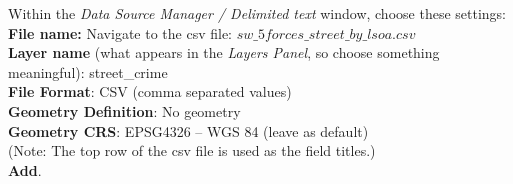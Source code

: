 %	
%	
	
	
	


Within the \textit{Data Source Manager / Delimited text} window, choose these settings:\\
\textbf{File name:} Navigate to the csv file: $sw\_5forces\_street\_by\_lsoa.csv$\\
\textbf{Layer name} (what appears in the \textit{Layers Panel}, so choose something meaningful): street\_crime\\
\textbf{File Format}: CSV (comma separated values)\\
\textbf{Geometry Definition}: No geometry\\
\textbf{Geometry CRS}: EPSG4326 – WGS 84 (leave as default)\\
(Note: The top row of the csv file is used as the field titles.)\\
\textbf{Add}.\\

